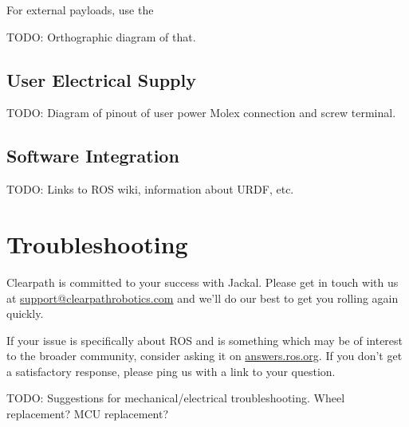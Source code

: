 \documentclass[]{clearpath-manual}
\begin{document}
For external payloads, use the 

TODO: Orthographic diagram of that.

\subsection{User Electrical Supply}\label{payload-elec}

TODO: Diagram of pinout of user power Molex connection and screw terminal.

\subsection{Software Integration}

TODO: Links to ROS wiki, information about URDF, etc.


\section{Troubleshooting}\label{trouble}

Clearpath is committed to your success with Jackal. Please get in touch with us at
\href{mailto:support@clearpathrobotics.com}{support@clearpathrobotics.com} and we'll do our
best to get you rolling again quickly.

If your issue is specifically about ROS and is something which may be of interest
to the broader community, consider asking it on \href{http://answers.ros.org}{answers.ros.org}.
If you don't get a satisfactory response, please ping us with a link to your question.

TODO: Suggestions for mechanical/electrical troubleshooting. Wheel replacement? MCU replacement? 
\end{document}
